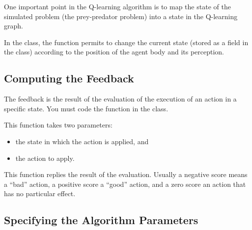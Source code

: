 \documentclass[article,english,nodocumentinfo]{multiagentfrreport}
\begin{document}
One important point in the Q-learning algorithm is to map the state of the simulated problem (the prey-predator problem) into a state in the Q-learning graph.

In the  class, the function  permits to change the current state (stored as a field in the  class) according to the position of the agent body and its perception.

\subsection{Computing the Feedback}

The feedback is the result of the evaluation of the execution of an action in a specific state.
You must code the  function in the  class.

This function takes two parameters:
\begin{itemize}
\item the state in which the action is applied, and
\item the action to apply.
\end{itemize}

This function replies the result of the evaluation. Usually a negative score means a ``bad'' action, a positive score a ``good'' action, and a zero score an action that has no particular effect.

\subsection{Specifying the Algorithm Parameters}
\end{document}
